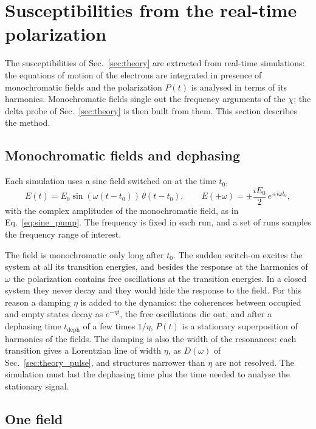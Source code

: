\documentclass[10pt,a4paper]{paper}
\begin{document}
\section{Susceptibilities from the real-time polarization}
\label{sec:extraction}

The susceptibilities of Sec.~\ref{sec:theory} are extracted from real-time simulations: the equations of motion of
the electrons are integrated in presence of monochromatic fields and the polarization $P(t)$ is analysed in terms of
its harmonics. Monochromatic fields single out the frequency arguments of the $\chi$; the delta probe of
Sec.~\ref{sec:theory} is then built from them. This section describes the method.

\subsection{Monochromatic fields and dephasing}
\label{sec:extraction_damping}

Each simulation uses a sine field switched on at the time $t_0$,
\begin{equation}
E(t) = E_0\sin(\omega(t-t_0))\,\theta(t-t_0) , \qquad E(\pm\omega) = \pm\frac{iE_0}{2}\,e^{\pm i\omega t_0} ,
\label{eq:sine_field}
\end{equation}
with the complex amplitudes of the monochromatic field, as in Eq.~\eqref{eq:sine_pump}. The frequency is fixed in each
run, and a set of runs samples the frequency range of interest.

The field is monochromatic only long after $t_0$. The sudden switch-on excites the system at all its transition
energies, and besides the response at the harmonics of $\omega$ the polarization contains free oscillations at the
transition energies. In a closed system they never decay and they would hide the response to the field. For this
reason a damping $\eta$ is added to the dynamics: the coherences between occupied and empty states decay as
$e^{-\eta t}$, the free oscillations die out, and after a dephasing time $t_{\mathrm{deph}}$ of a few times $1/\eta$, $P(t)$ is a
stationary superposition of harmonics of the fields. The damping is also
the width of the resonances: each transition gives a Lorentzian line of width $\eta$, as $D(\omega)$ of
Sec.~\ref{sec:theory_pulse}, and structures narrower than $\eta$ are not resolved. The simulation must last the
dephasing time plus the time needed to analyse the stationary signal.

\subsection{One field}
\label{sec:extraction_single}
\end{document}
